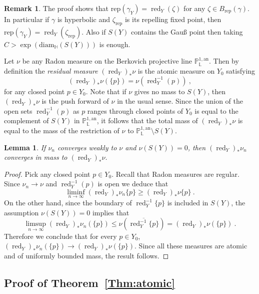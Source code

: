 \documentclass[10pt]{amsart}
\newtheorem{lemm}[theo]{Lemma}\newtheorem{prop}[theo]{Proposition}\newtheorem{coro}[theo]{Corollary}\newtheorem{conj}[theo]{Conjecture}
\theoremstyle{definition}\newtheorem{defi}[theo]{Definition}\newtheorem{rema}[theo]{Remark}\newtheorem{exam}[theo]{Example}\newtheorem{exem}[theo]{Example}\newtheorem{nota}[theo]{Notation}
\DeclareMathOperator{\red}{red}
\newcommand{\an}{\mathrm{an}}
\newcommand{\PP}{\mathbb{P}}
\newcommand{\Laurent}{\mathbb{L}}
\newcommand{\rep}{\mathrm{rep}}
\begin{document}
\begin{rema}\label{rem:more precise}
The proof shows that $\mathrm{rep}(\gamma_Y) = \red_Y (\zeta)$ for any $\zeta \in B_{\rep}(\gamma)$. In particular if $\gamma$ is hyperbolic and $\zeta_{\mathrm{rep}}$ is its repelling fixed point, then $\mathrm{rep}(\gamma_Y) = \red_Y (\zeta_{\mathrm{rep}})$. Also if $S(Y)$ contains the Gau{\ss} point then taking $C > \exp (\mathrm{diam}_\mathbb{H} (S(Y)))$ is enough.
\end{rema}

Let $\nu$ be any Radon measure on the Berkovich projective line $\PP^{1,\an}_{\Laurent}$. Then by definition the \emph{residual measure} $(\red_Y)_* \nu$ is the atomic measure on $Y_0$ satisfying
\[
{(\red_Y)_* \nu} (\{ p \}) = \nu (\red_Y^{-1}(p))~,
\]
for any closed point $p\in Y_0$. Note that if $\nu$ gives no mass to $S(Y)$, then $(\red_Y)_* \nu$ is the push forward of $\nu$ in the usual sense. Since the union of the open sets $\red_Y^{-1}(p)$ as $p$ ranges through closed points of $Y_0$ is equal to the complement of $S(Y)$ in $\PP^{1,\an}_{\Laurent}$, it follows that the total mass of $(\red_Y)_* \nu$ is equal to the mass of the restriction of $\nu$ to $\PP^{1,\an}_{\Laurent}\setminus S(Y)$.

\begin{lemm}\label{lem:cvg mass}
If $\nu_n$ converges weakly to $\nu$ and $\nu(S(Y)) =0$, then $(\red_Y)_* \nu_n$ converges in mass to $(\red_Y)_* \nu$.
\end{lemm}

\begin{proof}
Pick any closed point $p\in Y_0$. Recall that Radon measures are regular. Since $\nu_n \to \nu$ and $\red_Y^{-1}(p)$ is open we deduce that
\[
\liminf_{n\to\infty} (\red_Y)_* \nu_n \{ p \} \ge (\red_Y)_* \nu \{ p \}~.
\]
On the other hand, since the boundary of $\red_Y^{-1} \{ p \}$ is included in $S(Y)$, the assumption $\nu(S(Y)) =0$ implies that
\[
\limsup_{n\to\infty} (\red_Y)_* \nu_n (\{ p \}) \le \nu \left(\overline{ \red_Y^{-1} \{ p \}} \right) = (\red_Y)_* \nu (\{ p \})~.
\]
Therefore we conclude that for every $p\in Y_0$, $(\red_Y)_* \nu_n(\{p \}) \to (\red_Y)_* \nu (\{p\})$. Since all these measures are atomic and of uniformly bounded mass, the result follows.
\end{proof}

\subsection{Proof of Theorem~\ref{Thm:atomic}}\label{subs:atomic}
\end{document}
